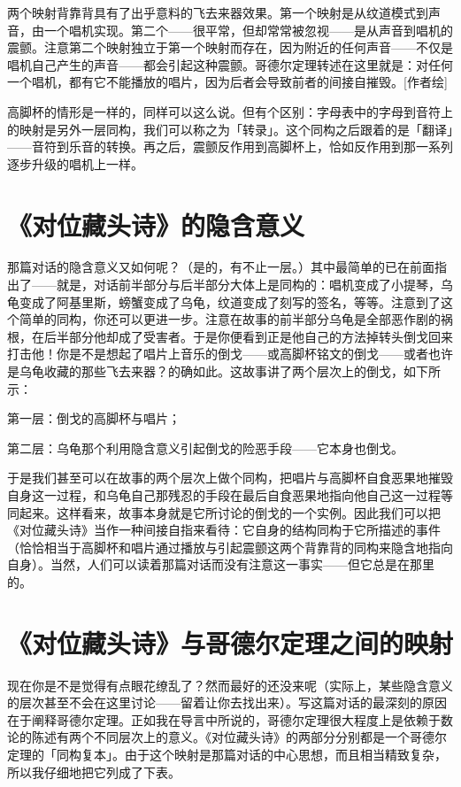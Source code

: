 \documentclass[
  12pt,
  twoside,
  openright,
  oldfontcommands,
]{memoir}
\begin{document}
两个映射背靠背具有了出乎意料的飞去来器效果。第一个映射是从纹道模式到声音，由一个唱机实现。第二个------很平常，但却常常被忽视------是从声音到唱机的震颤。注意第二个映射独立于第一个映射而存在，因为附近的任何声音------不仅是唱机自己产生的声音------都会引起这种震颤。哥德尔定理转述在这里就是：对任何一个唱机，都有它不能播放的唱片，因为后者会导致前者的间接自摧毁。{[}作者绘{]}

高脚杯的情形是一样的，同样可以这么说。但有个区别：字母表中的字母到音符上的映射是另外一层同构，我们可以称之为「转录」。这个同构之后跟着的是「翻译」------音符到乐音的转换。再之后，震颤反作用到高脚杯上，恰如反作用到那一系列逐步升级的唱机上一样。

\section{《对位藏头诗》的隐含意义}

那篇对话的隐含意义又如何呢？（是的，有不止一层。）其中最简单的已在前面指出了------就是，对话前半部分与后半部分大体上是同构的：唱机变成了小提琴，乌龟变成了阿基里斯，螃蟹变成了乌龟，纹道变成了刻写的签名，等等。注意到了这个简单的同构，你还可以更进一步。注意在故事的前半部分乌龟是全部恶作剧的祸根，在后半部分他却成了受害者。于是你便看到正是他自己的方法掉转头倒戈回来打击他！你是不是想起了唱片上音乐的倒戈------或高脚杯铭文的倒戈------或者也许是乌龟收藏的那些飞去来器？的确如此。这故事讲了两个层次上的倒戈，如下所示：

第一层：倒戈的高脚杯与唱片；

第二层：乌龟那个利用隐含意义引起倒戈的险恶手段------它本身也倒戈。

于是我们甚至可以在故事的两个层次上做个同构，把唱片与高脚杯自食恶果地摧毁自身这一过程，和乌龟自己那残忍的手段在最后自食恶果地指向他自己这一过程等同起来。这样看来，故事本身就是它所讨论的倒戈的一个实例。因此我们可以把《对位藏头诗》当作一种间接自指来看待：它自身的结构同构于它所描述的事件（恰恰相当于高脚杯和唱片通过播放与引起震颤这两个背靠背的同构来隐含地指向自身）。当然，人们可以读着那篇对话而没有注意这一事实------但它总是在那里的。

\section{《对位藏头诗》与哥德尔定理之间的映射}

现在你是不是觉得有点眼花缭乱了？然而最好的还没来呢（实际上，某些隐含意义的层次甚至不会在这里讨论------留着让你去找出来）。写这篇对话的最深刻的原因在于阐释哥德尔定理。正如我在导言中所说的，哥德尔定理很大程度上是依赖于数论的陈述有两个不同层次上的意义。《对位藏头诗》的两部分分别都是一个哥德尔定理的「同构复本」。由于这个映射是那篇对话的中心思想，而且相当精致复杂，所以我仔细地把它列成了下表。
\end{document}
